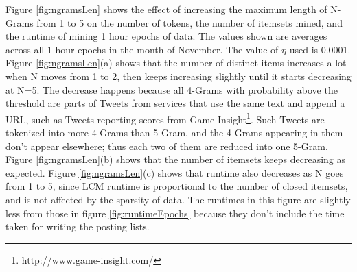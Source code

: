 \documentclass{sig-alternate}
\begin{document}
Figure \ref{fig:ngramsLen} shows the effect of increasing the maximum length of N-Grams from 1 to 5 on the number of tokens, the number of itemsets mined, and the runtime of mining 1 hour epochs of data. The values shown are averages across all 1 hour epochs in the month of November. The value of $\eta$ used is 0.0001.
Figure \ref{fig:ngramsLen}(a) shows that the number of distinct items increases a lot when N moves from 1 to 2, then keeps increasing slightly until it starts decreasing at N=5. The decrease happens because all 4-Grams with probability above the threshold are parts of Tweets from services that use the same text and append a URL, such as Tweets reporting scores from Game Insight\footnote{http://www.game-insight.com/}. Such Tweets are tokenized into more 4-Grams than 5-Gram, and the 4-Grams appearing in them don't appear elsewhere; thus each two of them are reduced into one 5-Gram.  Figure \ref{fig:ngramsLen}(b) shows that the number of itemsets keeps decreasing as expected.  Figure \ref{fig:ngramsLen}(c) shows that runtime also decreases as N goes from 1 to 5, since LCM runtime is proportional to the number of closed itemsets, and is not affected by the sparsity of data. The runtimes in this figure are slightly less from those in figure \ref{fig:runtimeEpochs} because they don't include the time taken for writing the posting lists.
\end{document}
